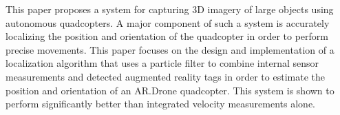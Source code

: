 This paper proposes a system for capturing 3D imagery of large objects using autonomous quadcopters. A major component of such a system is accurately localizing the position and orientation of the quadcopter in order to perform precise movements. This paper focuses on the design and implementation of a localization algorithm that uses a particle filter to combine internal sensor measurements and detected augmented reality tags in order to estimate the position and orientation of an AR.Drone quadcopter. This system is shown to perform significantly better than integrated velocity measurements alone.